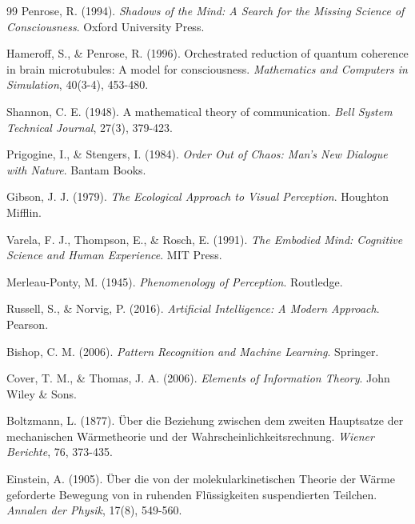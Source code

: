 \documentclass[12pt,a4paper]{article}
\begin{document}
\begin{thebibliography}{99}
Penrose, R. (1994). \textit{Shadows of the Mind: A Search for the Missing Science of Consciousness}. Oxford University Press.

Hameroff, S., \& Penrose, R. (1996). Orchestrated reduction of quantum coherence in brain microtubules: A model for consciousness. \textit{Mathematics and Computers in Simulation}, 40(3-4), 453-480.

Shannon, C. E. (1948). A mathematical theory of communication. \textit{Bell System Technical Journal}, 27(3), 379-423.

Prigogine, I., \& Stengers, I. (1984). \textit{Order Out of Chaos: Man's New Dialogue with Nature}. Bantam Books.

Gibson, J. J. (1979). \textit{The Ecological Approach to Visual Perception}. Houghton Mifflin.

Varela, F. J., Thompson, E., \& Rosch, E. (1991). \textit{The Embodied Mind: Cognitive Science and Human Experience}. MIT Press.

Merleau-Ponty, M. (1945). \textit{Phenomenology of Perception}. Routledge.

Russell, S., \& Norvig, P. (2016). \textit{Artificial Intelligence: A Modern Approach}. Pearson.

Bishop, C. M. (2006). \textit{Pattern Recognition and Machine Learning}. Springer.

Cover, T. M., \& Thomas, J. A. (2006). \textit{Elements of Information Theory}. John Wiley \& Sons.

Boltzmann, L. (1877). Über die Beziehung zwischen dem zweiten Hauptsatze der mechanischen Wärmetheorie und der Wahrscheinlichkeitsrechnung. \textit{Wiener Berichte}, 76, 373-435.

Einstein, A. (1905). Über die von der molekularkinetischen Theorie der Wärme geforderte Bewegung von in ruhenden Flüssigkeiten suspendierten Teilchen. \textit{Annalen der Physik}, 17(8), 549-560.

\end{thebibliography}
\end{document}
